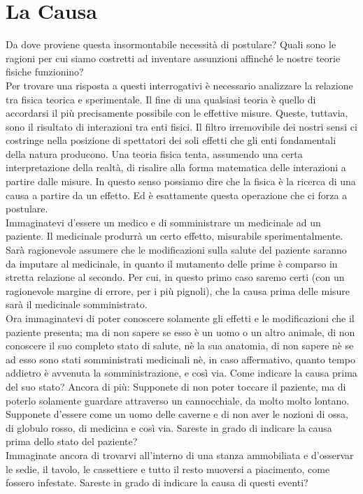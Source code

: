\documentclass[]{article}
\begin{document}
	\section{La Causa}
	Da dove proviene questa insormontabile necessità di postulare? Quali sono le ragioni per cui siamo costretti ad inventare assunzioni affinché le nostre teorie fisiche funzionino? \\
	Per trovare una risposta a questi interrogativi è necessario analizzare la relazione tra fisica teorica e sperimentale. Il fine di una qualsiasi teoria è quello di accordarsi il più precisamente possibile con le effettive misure. Queste, tuttavia, sono il risultato di interazioni tra enti fisici. Il filtro irremovibile dei nostri sensi ci costringe nella posizione di spettatori dei soli effetti che gli enti fondamentali della natura producono. Una teoria fisica tenta, assumendo una certa interpretazione della realtà, di risalire alla forma matematica delle interazioni a partire dalle misure. In questo senso possiamo dire che la fisica è la ricerca di una causa a partire da un effetto. Ed è esattamente questa operazione che ci forza a postulare.\\
	Immaginatevi d'essere un medico e di somministrare un medicinale ad un paziente. Il medicinale produrrà un certo effetto, misurabile sperimentalmente. Sarà ragionevole assumere che le modificazioni sulla salute del paziente saranno da imputare al medicinale, in quanto il mutamento delle prime è comparso in stretta relazione al secondo. Per cui, in questo primo caso saremo certi (con un ragionevole margine di errore, per i più pignoli), che la causa prima delle misure sarà il medicinale somministrato.\\
	Ora immaginatevi di poter conoscere solamente gli effetti e le modificazioni che il paziente presenta; ma di non sapere se esso è un uomo o un altro animale, di non conoscere il suo completo stato di salute, nè la sua anatomia, di non sapere nè se ad esso sono stati somministrati medicinali nè, in caso affermativo, quanto tempo addietro è avvenuta la somministrazione, e così via. Come indicare la causa prima del suo stato? Ancora di più: Supponete di non poter toccare il paziente, ma di poterlo solamente guardare attraverso un cannocchiale, da molto molto lontano. Supponete d'essere come un uomo delle caverne e di non aver le nozioni di ossa, di globulo rosso, di medicina e così via.
	Sareste in grado di indicare la causa prima dello stato del paziente?\\
	Immaginate ancora di trovarvi all'interno di una stanza ammobiliata e d'osservar le sedie, il tavolo, le cassettiere e tutto il resto muoversi a piacimento, come fossero infestate. Sareste in grado di indicare la causa di questi eventi? \\
\end{document}
